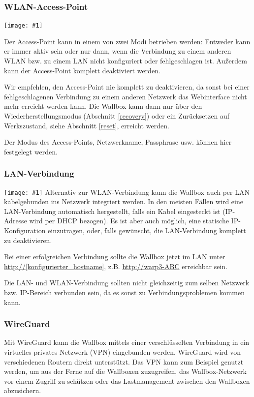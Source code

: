 \documentclass[a4paper,10pt]{article}
\newcommand{\hint}[1]{\begin{tcolorbox}[colback=boxgray,colframe=black,coltext=
white,title=Hinweis,left*=2mm,right*=2mm,boxsep=1mm,bottom=1mm,top=1mm]#1\end{tcolorbox}}
\newcommand{\gfx}[1]{\texttt{[image: \#1]}}
\begin{document}
\begin{multicols*}{2}
    \subsubsection{WLAN-Access-Point}
    \gfx{./img_warp3/resized/web_wifi_ap}

    Der Access-Point kann in einem von zwei Modi betrieben werden: Entweder kann er immer aktiv sein
    oder nur dann, wenn die Verbindung zu einem anderen WLAN bzw. zu einem LAN nicht konfiguriert oder fehlgeschlagen ist.
    Außerdem kann der Access-Point komplett deaktiviert werden.
    \hint{Wir empfehlen, den Access-Point nie komplett zu deaktivieren, da sonst bei einer
        fehlgeschlagenen Verbindung zu einem anderen Netzwerk das Webinterface nicht mehr erreicht
        werden kann. Die Wallbox kann dann nur über den Wiederherstellungsmodus
        (Abschnitt \ref{recovery}) oder ein Zurücksetzen auf Werkszustand, siehe Abschnitt \ref{reset}, erreicht werden.}

    Der Modus des Access-Points, Netzwerkname, Passphrase usw. können hier festgelegt werden.

    \subsubsection{LAN-Verbindung}
    \gfx{./img_warp3/resized/web_ethernet}
    Alternativ zur WLAN-Verbindung kann die Wallbox auch per LAN kabelgebunden
    ins Netzwerk integriert werden. In den meisten Fällen wird eine
    LAN-Verbindung automatisch hergestellt, falls ein Kabel eingesteckt ist
    (IP-Adresse wird per DHCP bezogen). Es ist aber auch möglich,
    eine statische IP-Konfiguration einzutragen, oder, falls gewünscht, die LAN-Verbindung
    komplett zu deaktivieren.

    Bei einer erfolgreichen Verbindung sollte die Wallbox jetzt im LAN unter
    \url{http://[konfigurierter_hostname]}, z.B. \url{http://warp3-ABC} erreichbar sein.

    \hint{Die LAN- und WLAN-Verbindung sollten nicht gleichzeitig zum selben Netzwerk bzw. IP-Bereich verbunden sein,
    da es sonst zu Verbindungsproblemen kommen kann.}

    \subsubsection{WireGuard}

    Mit WireGuard kann die Wallbox mittels einer verschlüsselten Verbindung in ein virtuelles privates Netzwerk (VPN) eingebunden werden. WireGuard wird von
    verschiedenen Routern direkt unterstützt. Das VPN kann zum Beispiel genutzt
    werden, um aus der Ferne auf die Wallboxen zuzugreifen, das
    Wallbox-Netzwerk vor einem Zugriff zu schützen oder das
    Lastmanagement zwischen den Wallboxen abzusichern.


\end{multicols*}
\end{document}
